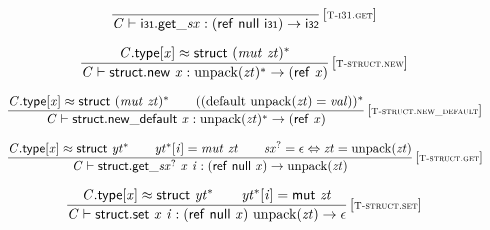 \vspace{1ex}

$$
\begin{array}{@{}c@{}}\displaystyle
\frac{
}{
{\mathit{C}} \vdash {{\mathsf{i{\scriptstyle31}.get}}{\mathsf{\_}}}{{\mathit{sx}}} : (\mathsf{ref}~\mathsf{null}~\mathsf{i{\scriptstyle31}}) \rightarrow \mathsf{i{\scriptstyle32}}
} \, {[\textsc{\scriptsize T{-}i31.get}]}
\qquad
\end{array}
$$

\vspace{1ex}

$$
\begin{array}{@{}c@{}}\displaystyle
\frac{
{\mathit{C}}.\mathsf{type}{}[{\mathit{x}}] \approx \mathsf{struct}~{({\mathit{mut}}~{\mathit{zt}})^\ast}
}{
{\mathit{C}} \vdash \mathsf{struct.new}~{\mathit{x}} : {{\mathrm{unpack}}({\mathit{zt}})^\ast} \rightarrow (\mathsf{ref}~{\mathit{x}})
} \, {[\textsc{\scriptsize T{-}struct.new}]}
\qquad
\end{array}
$$

$$
\begin{array}{@{}c@{}}\displaystyle
\frac{
{\mathit{C}}.\mathsf{type}{}[{\mathit{x}}] \approx \mathsf{struct}~{({\mathit{mut}}~{\mathit{zt}})^\ast}
 \qquad
(({\mathrm{default}}~{\mathrm{unpack}}({\mathit{zt}}) = {\mathit{val}}))^\ast
}{
{\mathit{C}} \vdash \mathsf{struct.new\_default}~{\mathit{x}} : {{\mathrm{unpack}}({\mathit{zt}})^\ast} \rightarrow (\mathsf{ref}~{\mathit{x}})
} \, {[\textsc{\scriptsize T{-}struct.new\_default}]}
\qquad
\end{array}
$$

$$
\begin{array}{@{}c@{}}\displaystyle
\frac{
{\mathit{C}}.\mathsf{type}{}[{\mathit{x}}] \approx \mathsf{struct}~{{\mathit{yt}}^\ast}
 \qquad
{{\mathit{yt}}^\ast}{}[{\mathit{i}}] = {\mathit{mut}}~{\mathit{zt}}
 \qquad
{{\mathit{sx}}^?} = \epsilon \Leftrightarrow {\mathit{zt}} = {\mathrm{unpack}}({\mathit{zt}})
}{
{\mathit{C}} \vdash {{\mathsf{struct.get}}{\mathsf{\_}}}{{{\mathit{sx}}^?}}~{\mathit{x}}~{\mathit{i}} : (\mathsf{ref}~\mathsf{null}~{\mathit{x}}) \rightarrow {\mathrm{unpack}}({\mathit{zt}})
} \, {[\textsc{\scriptsize T{-}struct.get}]}
\qquad
\end{array}
$$

$$
\begin{array}{@{}c@{}}\displaystyle
\frac{
{\mathit{C}}.\mathsf{type}{}[{\mathit{x}}] \approx \mathsf{struct}~{{\mathit{yt}}^\ast}
 \qquad
{{\mathit{yt}}^\ast}{}[{\mathit{i}}] = \mathsf{mut}~{\mathit{zt}}
}{
{\mathit{C}} \vdash \mathsf{struct.set}~{\mathit{x}}~{\mathit{i}} : (\mathsf{ref}~\mathsf{null}~{\mathit{x}})~{\mathrm{unpack}}({\mathit{zt}}) \rightarrow \epsilon
} \, {[\textsc{\scriptsize T{-}struct.set}]}
\qquad
\end{array}
$$

